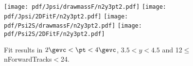 \begin{figure}[H]
\begin{center}
\texttt{[image: pdf/Jpsi/drawmassF/n2y3pt2.pdf]}
\texttt{[image: pdf/Jpsi/2DFitF/n2y3pt2.pdf]}
\vspace*{-0.5cm}
\texttt{[image: pdf/Psi2S/drawmassF/n2y3pt2.pdf]}
\texttt{[image: pdf/Psi2S/2DFitF/n2y3pt2.pdf]}
\vspace*{-0.5cm}
\end{center}
\caption{Fit results in $2\gevc<\pt<4\gevc$, $3.5<y<4.5$ and 12$\leq$nForwardTracks$<$24.}
\label{Fitn2y3pt2}
\end{figure}

